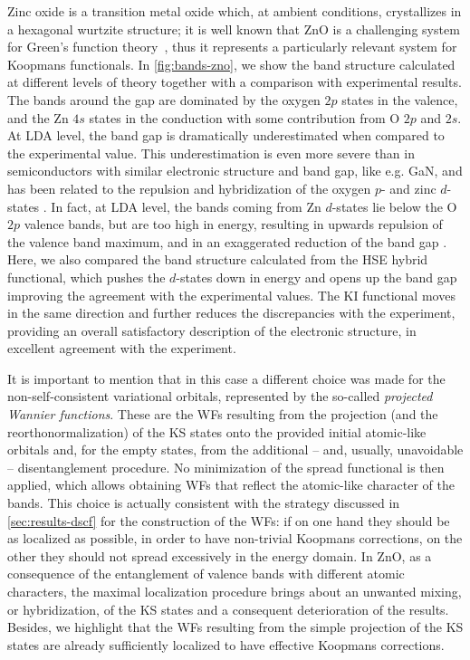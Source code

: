 Zinc oxide is a transition metal oxide which, at ambient conditions, crystallizes in a hexagonal wurtzite structure; it is well known that ZnO is a challenging system for Green's function theory~\cite{shih_quasiparticle_2010,samsonidze_insights_2014}, thus it represents a particularly relevant system for Koopmans functionals. In \cref{fig:bands-zno}, we show the band structure calculated at different levels of theory together with a comparison with experimental results. The bands around the gap are dominated by the oxygen $2p$ states in the valence, and the Zn $4s$ states in the conduction with some contribution from O $2p$ and $2s$. At LDA level, the band gap is dramatically underestimated when compared to the experimental value. This underestimation is even more severe than in semiconductors with similar electronic structure and band gap, like e.g. GaN, and has been related to the repulsion and hybridization of the oxygen $p$- and zinc $d$-states \cite{wei_role_1988, lim_angle-resolved_2012}. In fact, at LDA level, the bands coming from Zn $d$-states lie below the O $2p$ valence bands, but are too high in energy, resulting in upwards repulsion of the valence band maximum, and in an exaggerated reduction of the band gap \cite{lim_angle-resolved_2012}. Here, we also compared the band structure calculated from the HSE hybrid functional, which pushes the $d$-states down in energy and opens up the band gap improving the agreement with the experimental values. The KI functional moves in the same direction and further reduces the discrepancies with the experiment, providing an overall satisfactory description of the electronic structure, in excellent agreement with the experiment.

It is important to mention that in this case a different choice was made for the non-self-consistent variational orbitals, represented by the so-called \emph{projected Wannier functions}. These are the WFs resulting from the projection (and the reorthonormalization) of the KS states onto the provided initial atomic-like orbitals and, for the empty states, from the additional -- and, usually, unavoidable -- disentanglement procedure. No minimization of the spread functional is then applied, which allows obtaining WFs that reflect the atomic-like character of the bands. This choice is actually consistent with the strategy discussed in \cref{sec:results-dscf} for the construction of the WFs: if on one hand they should be as localized as possible, in order to have non-trivial Koopmans corrections, on the other they should not spread excessively in the energy domain. In ZnO, as a consequence of the entanglement of valence bands with different atomic characters, the maximal localization procedure brings about an unwanted mixing, or hybridization, of the KS states and a consequent deterioration of the results. Besides, we highlight that the WFs resulting from the simple projection of the KS states are already sufficiently localized to have effective Koopmans corrections.

